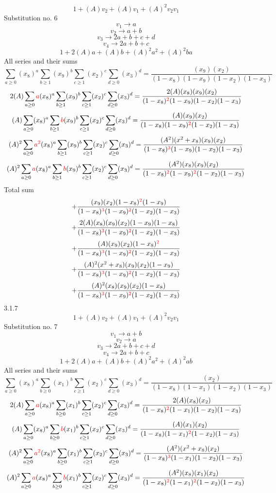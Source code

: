 \documentclass{article}
\begin{document}
\[1+(A)v_2+(A)v_1+(A)^2v_2v_1\]Substitution no. 6\[v_1\rightarrow{a}\]\[v_2\rightarrow{a+b}\]\[v_3\rightarrow{2a+b+c+d}\]\[v_4\rightarrow{2a+b+c}\]\[1+2(A)a+(A)b+(A)^2a^{2}+(A)^2ba\]All series and their sums\[\sum_{a\geq{0}}(x_8)^{a}\sum_{b\geq{1}}(x_9)^{b}\sum_{c\geq{1}}(x_2)^{c}\sum_{d\geq{0}}(x_3)^{d}=\frac{(x_9)(x_2)}{(1-x_8)(1-x_9)(1-x_2)(1-x_3)}\]\[2(A)\sum_{a\geq{0}}\textcolor{red}{a}(x_8)^{a}\sum_{b\geq{1}}(x_9)^{b}\sum_{c\geq{1}}(x_2)^{c}\sum_{d\geq{0}}(x_3)^{d}=\frac{2(A)(x_8)(x_9)(x_2)}{(1-x_8)^{\textcolor{red}{2}}(1-x_9)(1-x_2)(1-x_3)}\]\[(A)\sum_{a\geq{0}}(x_8)^{a}\sum_{b\geq{1}}\textcolor{red}{b}(x_9)^{b}\sum_{c\geq{1}}(x_2)^{c}\sum_{d\geq{0}}(x_3)^{d}=\frac{(A)(x_9)(x_2)}{(1-x_8)(1-x_9)^{\textcolor{red}{2}}(1-x_2)(1-x_3)}\]\[(A)^{2}\sum_{a\geq{0}}\textcolor{red}{a^{2}}(x_8)^{a}\sum_{b\geq{1}}(x_9)^{b}\sum_{c\geq{1}}(x_2)^{c}\sum_{d\geq{0}}(x_3)^{d}=\frac{(A^{2})(x^{2}+x_8)(x_9)(x_2)}{(1-x_8)^{\textcolor{red}{3}}(1-x_9)(1-x_2)(1-x_3)}\]\[(A)^{2}\sum_{a\geq{0}}\textcolor{red}{a}(x_8)^{a}\sum_{b\geq{1}}\textcolor{red}{b}(x_9)^{b}\sum_{c\geq{1}}(x_2)^{c}\sum_{d\geq{0}}(x_3)^{d}=\frac{(A^{2})(x_8)(x_9)(x_2)}{(1-x_8)^{\textcolor{red}{2}}(1-x_9)^{\textcolor{red}{2}}(1-x_2)(1-x_3)}\]
Total sum
\[+\frac{(x_9)(x_2)(1-x_8)^{\textcolor{red}{2}}(1-x_9)}{(1-x_8)^{\textcolor{red}{3}}(1-x_9)^{\textcolor{red}{2}}(1-x_2)(1-x_3)}\]\[+\frac{2(A)(x_8)(x_9)(x_2)(1-x_9)(1-x_8)}{(1-x_8)^{\textcolor{red}{3}}(1-x_9)^{\textcolor{red}{2}}(1-x_2)(1-x_3)}\]\[+\frac{(A)(x_9)(x_2)(1-x_8)^{\textcolor{red}{2}}}{(1-x_8)^{\textcolor{red}{3}}(1-x_9)^{\textcolor{red}{2}}(1-x_2)(1-x_3)}\]\[+\frac{(A)^{2}(x^{2}+x_8)(x_9)(x_2)(1-x_9)}{(1-x_8)^{\textcolor{red}{3}}(1-x_9)^{\textcolor{red}{2}}(1-x_2)(1-x_3)}\]\[+\frac{(A)^{2}(x_8)(x_9)(x_2)(1-x_8)}{(1-x_8)^{\textcolor{red}{3}}(1-x_9)^{\textcolor{red}{2}}(1-x_2)(1-x_3)}\]
3.1.7
\[1+(A)v_2+(A)v_1+(A)^2v_2v_1\]Substitution no. 7\[v_1\rightarrow{a+b}\]\[v_2\rightarrow{a}\]\[v_3\rightarrow{2a+b+c+d}\]\[v_4\rightarrow{2a+b+c}\]\[1+2(A)a+(A)b+(A)^2a^{2}+(A)^2ab\]All series and their sums\[\sum_{a\geq{0}}(x_8)^{a}\sum_{b\geq{0}}(x_1)^{b}\sum_{c\geq{1}}(x_2)^{c}\sum_{d\geq{0}}(x_3)^{d}=\frac{(x_2)}{(1-x_8)(1-x_1)(1-x_2)(1-x_3)}\]\[2(A)\sum_{a\geq{0}}\textcolor{red}{a}(x_8)^{a}\sum_{b\geq{0}}(x_1)^{b}\sum_{c\geq{1}}(x_2)^{c}\sum_{d\geq{0}}(x_3)^{d}=\frac{2(A)(x_8)(x_2)}{(1-x_8)^{\textcolor{red}{2}}(1-x_1)(1-x_2)(1-x_3)}\]\[(A)\sum_{a\geq{0}}(x_8)^{a}\sum_{b\geq{0}}\textcolor{red}{b}(x_1)^{b}\sum_{c\geq{1}}(x_2)^{c}\sum_{d\geq{0}}(x_3)^{d}=\frac{(A)(x_1)(x_2)}{(1-x_8)(1-x_1)^{\textcolor{red}{2}}(1-x_2)(1-x_3)}\]\[(A)^{2}\sum_{a\geq{0}}\textcolor{red}{a^{2}}(x_8)^{a}\sum_{b\geq{0}}(x_1)^{b}\sum_{c\geq{1}}(x_2)^{c}\sum_{d\geq{0}}(x_3)^{d}=\frac{(A^{2})(x^{2}+x_8)(x_2)}{(1-x_8)^{\textcolor{red}{3}}(1-x_1)(1-x_2)(1-x_3)}\]\[(A)^{2}\sum_{a\geq{0}}\textcolor{red}{a}(x_8)^{a}\sum_{b\geq{0}}\textcolor{red}{b}(x_1)^{b}\sum_{c\geq{1}}(x_2)^{c}\sum_{d\geq{0}}(x_3)^{d}=\frac{(A^{2})(x_8)(x_1)(x_2)}{(1-x_8)^{\textcolor{red}{2}}(1-x_1)^{\textcolor{red}{2}}(1-x_2)(1-x_3)}\]
\end{document}
